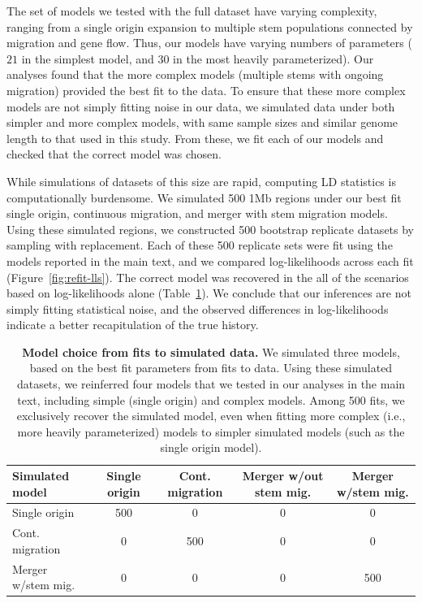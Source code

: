 \documentclass[]{article}
\begin{document}
The set of models we tested with the full dataset have varying complexity,
ranging from a single origin expansion to multiple stem populations connected
by migration and gene flow. Thus, our models have varying numbers of parameters
($21$ in the simplest model, and $30$ in the most heavily parameterized). Our
analyses found that the more complex models (multiple stems with ongoing
migration) provided the best fit to the data. To ensure that these more complex
models are not simply fitting noise in our data, we simulated data under both
simpler and more complex models, with same sample sizes and similar genome
length to that used in this study. From these, we fit each of our models and
checked that the correct model was chosen.

While simulations of datasets of this size are rapid, computing LD statistics
is computationally burdensome. We simulated 500 1Mb regions under our best fit
single origin, continuous migration, and merger with stem migration models.
Using these simulated regions, we constructed 500 bootstrap replicate datasets
by sampling with replacement. Each of these 500 replicate sets were fit using
the models reported in the main text, and we compared log-likelihoods across
each fit (Figure~\ref{fig:refit-lls}). The correct model was recovered in the
all of the scenarios based on log-likelihoods alone
(Table~\ref{tab:confusion-matrix}). We conclude that our inferences are not
simply fitting statistical noise, and the observed differences in
log-likelihoods indicate a better recapitulation of the true history.

\begin{table}[ht]
    \caption{
        \label{tab:confusion-matrix}
        \textbf{Model choice from fits to simulated data.} We simulated three
        models, based on the best fit parameters from fits to data. Using these
        simulated datasets, we reinferred four models that we tested in our
        analyses in the main text, including simple (single origin) and complex
        models. Among 500 fits, we exclusively recover the simulated
        model, even when fitting more complex (i.e., more heavily
        parameterized) models to simpler simulated models (such as the single
        origin model).
    }
    \centering
    \begin{tabular}[t]{lcccc}
        \toprule
        Simulated model & Single origin & Cont. migration & Merger w/out stem mig. & Merger w/stem mig. \\
        \midrule
        Single origin & 500 & 0 & 0 & 0 \\
        Cont. migration & 0 & 500 & 0 & 0 \\
        Merger w/stem mig. & 0 & 0 & 0 & 500 \\
        \bottomrule
    \end{tabular}
\end{table}
\end{document}
